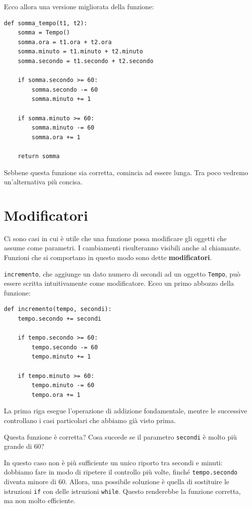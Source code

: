 \documentclass[10pt]{book}
\begin{document}
Ecco allora una versione migliorata della funzione:

\begin{verbatim}
def somma_tempo(t1, t2):
    somma = Tempo()
    somma.ora = t1.ora + t2.ora
    somma.minuto = t1.minuto + t2.minuto
    somma.secondo = t1.secondo + t2.secondo

    if somma.secondo >= 60:
        somma.secondo -= 60
        somma.minuto += 1

    if somma.minuto >= 60:
        somma.minuto -= 60
        somma.ora += 1

    return somma
\end{verbatim}
%
Sebbene questa funzione sia corretta, comincia ad essere lunga. Tra poco vedremo un'alternativa più concisa.


\section{Modificatori}
\label{increment}

Ci sono casi in cui è utile che una funzione possa modificare gli oggetti che assume come parametri. I cambiamenti risulteranno visibili anche al chiamante. Funzioni che si comportano in questo modo sono dette {\bf modificatori}.

{\tt incremento}, che aggiunge un dato numero di secondi ad un oggetto {\tt Tempo}, può essere scritta intuitivamente come modificatore. Ecco un primo abbozzo della funzione:

\begin{verbatim}
def incremento(tempo, secondi):
    tempo.secondo += secondi

    if tempo.secondo >= 60:
        tempo.secondo -= 60
        tempo.minuto += 1

    if tempo.minuto >= 60:
        tempo.minuto -= 60
        tempo.ora += 1
\end{verbatim}
%
La prima riga esegue l'operazione di addizione fondamentale, mentre le successive controllano i casi particolari che abbiamo già visto prima.

Questa funzione è corretta? Cosa succede se il parametro {\tt secondi}
è molto più grande di 60?  

In questo caso non è più sufficiente un unico riporto tra secondi e minuti: dobbiamo fare in modo di ripetere il controllo più volte, finché {\tt tempo.secondo} diventa minore di 60. Allora, una possibile soluzione è quella di sostituire le istruzioni {\tt if} con delle istruzioni {\tt while}.
Questo renderebbe la funzione corretta, ma non molto efficiente.
\end{document}
